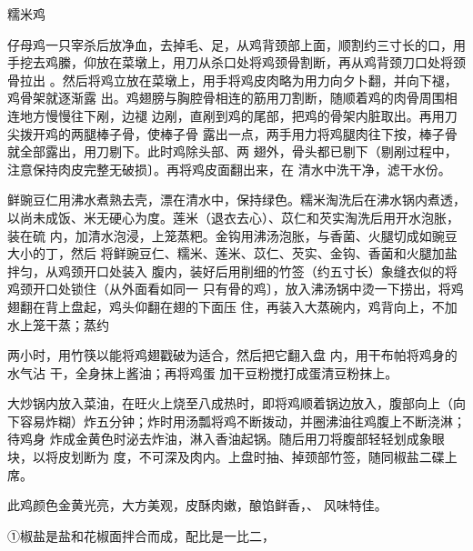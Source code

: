 \begin{recipe}[八宝糯米鸡]{糯米鸡}

\ingredients


\cooking

\step 仔母鸡一只宰杀后放净血，去掉毛、足，从鸡背颈部上面，顺割约三寸长的口，用
手挖去鸡縢，仰放在菜墩上，用刀从杀口处将鸡颈骨割断，再从鸡背颈刀口处将颈骨拉出
。然后将鸡立放在菜墩上，用手将鸡皮肉略为用力向夕卜翻，并向下褪，鸡骨架就逐渐露
出。鸡翅膀与胸腔骨相连的筋用刀割断，随顺着鸡的肉骨周围相连地方慢慢往下剐，边褪
边剐，直剐到鸡的尾部，把鸡的骨架内脏取出。再用刀尖拨开鸡的两腿棒子骨，使棒子骨
露出一点，两手用力将鸡腿肉往下按，棒子骨就全部露出，用刀剔下。此时鸡除头部、两
翅外，骨头都已剔下（剔剐过程中，注意保持肉皮完整无破损〕。再将鸡皮面翻出来，在
清水中洗干净，滤干水份。

\step 鲜豌豆仁用沸水煮熟去壳，漂在清水中，保持绿色。糯米淘洗后在沸水锅内煮透，
以尚未成饭、米无硬心为度。莲米（退衣去心）、苡仁和芡实淘洗后用开水泡胀，装在硫
内，加清水泡浸，上笼蒸粑。金钩用沸汤泡胀，与香菌、火腿切成如豌豆大小的丁，然后
将鲜豌豆仁、糯米、莲米、苡仁、芡实、金钩、香菌和火腿加盐拌匀，从鸡颈开口处装入
腹内，装好后用削细的竹签（约五寸长）象缝衣似的将鸡颈开口处锁住（从外面看如同一
只有骨的鸡〕，放入沸汤锅中烫一下捞出，将鸡翅翻在背上盘起，鸡头仰翻在翅的下面压
住，再装入大蒸碗内，鸡背向上，不加水上笼干蒸；蒸约

两小时，用竹筷以能将鸡翅戳破为适合，然后把它翻入盘 内，用干布帕将鸡身的水气沾
干，全身抹上酱油；再将鸡蛋 加干豆粉搅打成蛋清豆粉抹上。

\step 大炒锅内放入菜油，在旺火上烧至八成热时，即将鸡顺着锅边放入，腹部向上（向
下容易炸糊）炸五分钟；炸时用汤瓢将鸡不断拨动，并圈沸油往鸡腹上不断浇淋；待鸡身
炸成金黄色时泌去炸油，淋入香油起锅。随后用刀将腹部轻轻划成象眼块，以将皮划断为
度，不可深及肉内。上盘时抽、掉颈部竹签，随同椒盐二碟上席。

\notes

此鸡颜色金黄光亮，大方美观，皮酥肉嫩，酿馅鲜香，、 风味特佳。

①椒盐是盐和花椒面拌合而成，配比是一比二，

\end{recipe}

